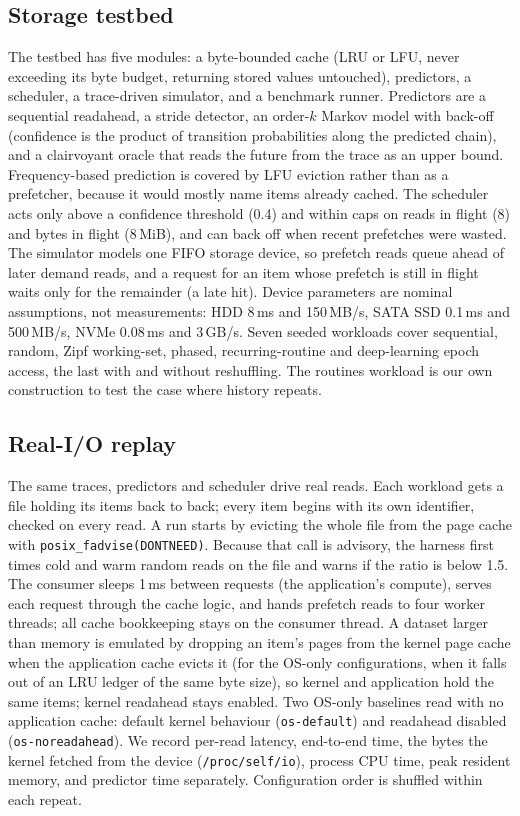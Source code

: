 \documentclass[conference]{IEEEtran}
\begin{document}
\subsection{Storage testbed}\label{sec:storagebed}
The testbed has five modules: a byte-bounded cache (LRU or LFU, never exceeding its byte budget, returning stored values untouched), predictors, a scheduler, a trace-driven simulator, and a benchmark runner. Predictors are a sequential readahead, a stride detector, an order-$k$ Markov model with back-off (confidence is the product of transition probabilities along the predicted chain), and a clairvoyant oracle that reads the future from the trace as an upper bound. Frequency-based prediction is covered by LFU eviction rather than as a prefetcher, because it would mostly name items already cached. The scheduler acts only above a confidence threshold (0.4) and within caps on reads in flight (8) and bytes in flight (8\,MiB), and can back off when recent prefetches were wasted. The simulator models one FIFO storage device, so prefetch reads queue ahead of later demand reads, and a request for an item whose prefetch is still in flight waits only for the remainder (a late hit). Device parameters are nominal assumptions, not measurements: HDD 8\,ms and 150\,MB/s, SATA SSD 0.1\,ms and 500\,MB/s, NVMe 0.08\,ms and 3\,GB/s. Seven seeded workloads cover sequential, random, Zipf working-set, phased, recurring-routine and deep-learning epoch access, the last with and without reshuffling. The routines workload is our own construction to test the case where history repeats.

\subsection{Real-I/O replay}\label{sec:realbed}
The same traces, predictors and scheduler drive real reads. Each workload gets a file holding its items back to back; every item begins with its own identifier, checked on every read. A run starts by evicting the whole file from the page cache with \texttt{posix\_fadvise(DONTNEED)}. Because that call is advisory, the harness first times cold and warm random reads on the file and warns if the ratio is below 1.5. The consumer sleeps 1\,ms between requests (the application's compute), serves each request through the cache logic, and hands prefetch reads to four worker threads; all cache bookkeeping stays on the consumer thread. A dataset larger than memory is emulated by dropping an item's pages from the kernel page cache when the application cache evicts it (for the OS-only configurations, when it falls out of an LRU ledger of the same byte size), so kernel and application hold the same items; kernel readahead stays enabled. Two OS-only baselines read with no application cache: default kernel behaviour (\texttt{os-default}) and readahead disabled (\texttt{os-noreadahead}). We record per-read latency, end-to-end time, the bytes the kernel fetched from the device (\texttt{/proc/self/io}), process CPU time, peak resident memory, and predictor time separately. Configuration order is shuffled within each repeat.
\end{document}
